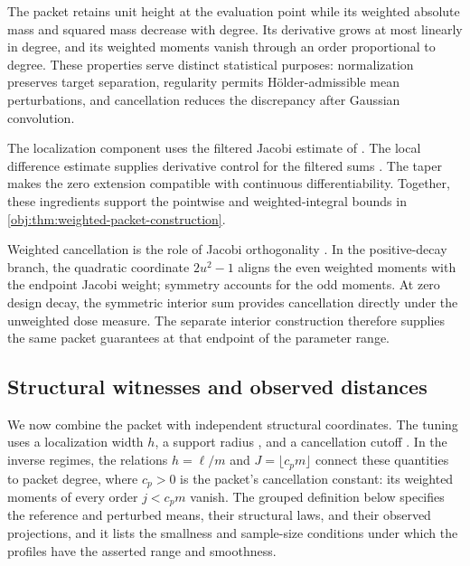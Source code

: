The packet retains unit height at the evaluation point while its weighted absolute mass and squared mass decrease with degree. Its derivative grows at most linearly in degree, and its weighted moments vanish through an order proportional to degree. These properties serve distinct statistical purposes: normalization preserves target separation, regularity permits Hölder-admissible mean perturbations, and cancellation reduces the discrepancy after Gaussian convolution.

The localization component uses the filtered Jacobi estimate of \citet[Theorem 2.4, equation (2.14)]{PetrushevXu2005}. The local difference estimate supplies derivative control for the filtered sums \citep[Theorem 2.2, equation (2.4)]{https://people.math.sc.edu/pencho/Publications/kpx-06-28-06-web.pdf}. The taper makes the zero extension compatible with continuous differentiability. Together, these ingredients support the pointwise and weighted-integral bounds in \cref{obj:thm:weighted-packet-construction}.

Weighted cancellation is the role of Jacobi orthogonality \citep[Table 18.3.1, Jacobi row and caption]{https://dlmf.nist.gov/18.3}. In the positive-decay branch, the quadratic coordinate \(2u^2-1\) aligns the even weighted moments with the endpoint Jacobi weight; symmetry accounts for the odd moments. At zero design decay, the symmetric interior sum provides cancellation directly under the unweighted dose measure. The separate interior construction therefore supplies the same packet guarantees at that endpoint of the parameter range.

\subsection{Structural witnesses and observed distances}

We now combine the packet with independent structural coordinates. The tuning uses a localization width \(h\), a support radius , and a cancellation cutoff . In the inverse regimes, the relations \(h=\ell/m\) and \(J=\lfloor c_pm\rfloor\) connect these quantities to packet degree, where \(c_p>0\) is the packet's cancellation constant: its weighted moments of every order \(j<c_pm\) vanish. The grouped definition below specifies the reference and perturbed means, their structural laws, and their observed projections, and it lists the smallness and sample-size conditions under which the profiles have the asserted range and smoothness.

